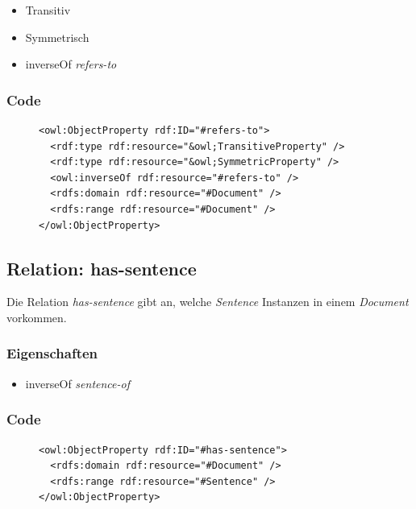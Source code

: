 \documentclass[
    11pt,
    latin1,
    a4paper,
    oneside
]{scrreprt}
\begin{document}
\begin{itemize}
  \item Transitiv
  \item Symmetrisch
  \item inverseOf \emph{refers-to}
\end{itemize}

\subsubsection{Code} \label{sec:rel_refersto_code}

\begin{figure}[H]
 \lstset{language=XML}
 \begin{lstlisting}[label=owl:refersto,caption={Die Relation \emph{refers-to} beschreibt die Abh\"angigkeiten unter Dokumenten}]
<owl:ObjectProperty rdf:ID="#refers-to">
  <rdf:type rdf:resource="&owl;TransitiveProperty" />
  <rdf:type rdf:resource="&owl;SymmetricProperty" />
  <owl:inverseOf rdf:resource="#refers-to" />
  <rdfs:domain rdf:resource="#Document" />
  <rdfs:range rdf:resource="#Document" />
</owl:ObjectProperty>
 \end{lstlisting}
\end{figure}


\subsection{Relation: has-sentence} \label{sec:rel_hassentence}

Die Relation \emph{has-sentence} gibt an, welche \emph{Sentence} Instanzen in einem \emph{Document} vorkommen.

\subsubsection{Eigenschaften} \label{sec:rel_hassentence_settings}

\begin{itemize}
  \item inverseOf \emph{sentence-of}
\end{itemize}

\subsubsection{Code} \label{sec:rel_hassentence_code}

\begin{figure}[H]
 \lstset{language=XML}
 \begin{lstlisting}[label=owl:hassentence,caption={Die Relation \emph{has-sentence} gibt an, welches Dokuemnt aus welchen S\"atzen besteht}]
<owl:ObjectProperty rdf:ID="#has-sentence">
  <rdfs:domain rdf:resource="#Document" />
  <rdfs:range rdf:resource="#Sentence" />
</owl:ObjectProperty>
 \end{lstlisting}
\end{figure}
\end{document}
